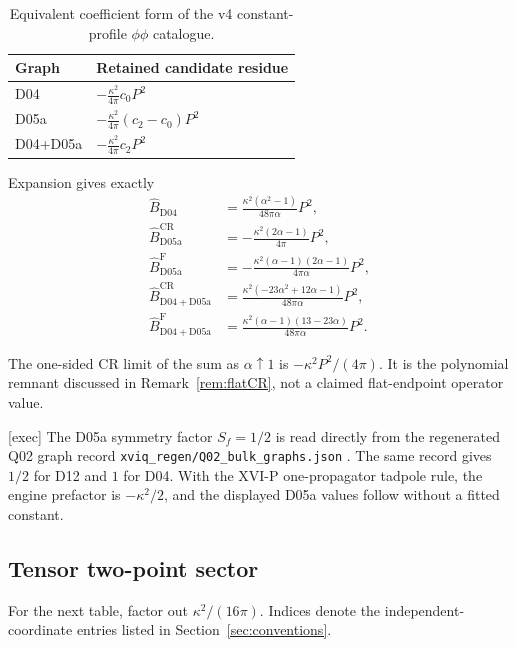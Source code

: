 \documentclass[11pt,a4paper]{article}
\newcommand{\ka}{\kappa}
\newcommand{\Fr}{\mathrm F}
\newcommand{\CR}{\mathrm{CR}}
\newcommand{\loc}[1]{\nolinkurl{#1}}
\theoremstyle{plain}
\theoremstyle{definition}
\theoremstyle{remark}
\numberwithin{equation}{section}
\begin{document}
\begin{table}[htbp]
\centering
\small
\begin{tabularx}{\linewidth}{@{}L{.20\linewidth}Y@{}}
\toprule
Graph & Retained candidate residue\\
\midrule
D04 &
\(\displaystyle -\frac{\ka^2}{4\pi}c_0P^2\)\\[6pt]
D05a &
\(\displaystyle -\frac{\ka^2}{4\pi}(c_2-c_0)P^2\)\\[6pt]
D04+D05a &
\(\displaystyle -\frac{\ka^2}{4\pi}c_2P^2\)\\
\bottomrule
\end{tabularx}
\caption{Equivalent coefficient form of the v4
constant-profile \(\phi\phi\) catalogue.}
\label{tab:phiC}
\end{table}

Expansion gives exactly
\begin{align}
\widehat B_{\mathrm{D04}}
 &=\frac{\ka^2(\alpha^2-1)}{48\pi\alpha}P^2,\nonumber\\
\widehat B_{\mathrm{D05a}}^\CR
 &=-\frac{\ka^2(2\alpha-1)}{4\pi}P^2,\nonumber\\
\widehat B_{\mathrm{D05a}}^\Fr
 &=-\frac{\ka^2(\alpha-1)(2\alpha-1)}
 {4\pi\alpha}P^2,\nonumber\\
\widehat B_{\mathrm{D04+D05a}}^\CR
 &=\frac{\ka^2(-23\alpha^2+12\alpha-1)}
 {48\pi\alpha}P^2,\nonumber\\
\widehat B_{\mathrm{D04+D05a}}^\Fr
 &=\frac{\ka^2(\alpha-1)(13-23\alpha)}
 {48\pi\alpha}P^2.
\label{eq:phiExpanded}
\end{align}

The one-sided CR limit of the sum as \(\alpha\uparrow1\) is
\(-\ka^2P^2/(4\pi)\).
It is the polynomial remnant discussed in
Remark~\ref{rem:flatCR}, not a claimed flat-endpoint operator value.

\textsf{[exec]} The D05a symmetry factor \(S_f=1/2\) is read directly
from the regenerated Q02 graph record
\loc{xviq_regen/Q02_bulk_graphs.json} \cite{CheungQ}.
The same record gives \(1/2\) for D12 and \(1\) for D04.
With the XVI-P one-propagator tadpole rule, the engine prefactor is
\(-\ka^2/2\), and the displayed D05a values follow without a fitted
constant.

\subsection{Tensor two-point sector}

For the next table, factor out \(\ka^2/(16\pi)\).
Indices denote the independent-coordinate entries listed in
Section~\ref{sec:conventions}.
\end{document}
